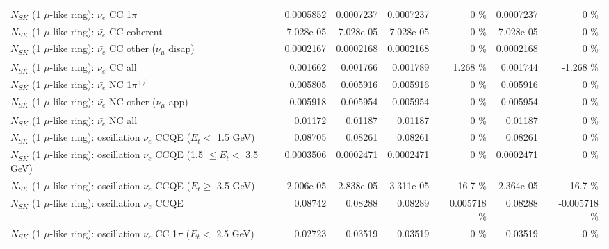\begin{table}
\begin{tabular}{| l | r | r | r  r | r  r |}
\hline
                           $N_{SK}$ (1 $\mu$-like ring): $\bar{\nu_e}$ CC 1$\pi$ &       0.0005852 &       0.0007237 &       0.0007237 &        0 \%  &       0.0007237 &        0 \%  \\ 
                         $N_{SK}$ (1 $\mu$-like ring): $\bar{\nu_e}$ CC coherent &       7.028e-05 &       7.028e-05 &       7.028e-05 &        0 \%  &       7.028e-05 &        0 \%  \\ 
          $N_{SK}$ (1 $\mu$-like ring): $\bar{\nu_e}$ CC other ($\nu_\mu$ disap) &       0.0002167 &       0.0002168 &       0.0002168 &        0 \%  &       0.0002168 &        0 \%  \\ 
                            $N_{SK}$ (1 $\mu$-like ring): $\bar{\nu_{e}}$ CC all &        0.001662 &        0.001766 &        0.001789 &    1.268 \%  &        0.001744 &   -1.268 \%  \\ 
\hline
                     $N_{SK}$ (1 $\mu$-like ring): $\bar{\nu_e}$ NC 1$\pi^{+/-}$ &        0.005805 &        0.005916 &        0.005916 &        0 \%  &        0.005916 &        0 \%  \\ 
            $N_{SK}$ (1 $\mu$-like ring): $\bar{\nu_e}$ NC other ($\nu_\mu$ app) &        0.005918 &        0.005954 &        0.005954 &        0 \%  &        0.005954 &        0 \%  \\ 
                            $N_{SK}$ (1 $\mu$-like ring): $\bar{\nu_{e}}$ NC all &         0.01172 &         0.01187 &         0.01187 &        0 \%  &         0.01187 &        0 \%  \\ 
\hline
\hline
\hline
      $N_{SK}$ (1 $\mu$-like ring): oscillation $\nu_e$ CCQE ($E_{t} <$ 1.5 GeV) &         0.08705 &         0.08261 &         0.08261 &        0 \%  &         0.08261 &        0 \%  \\ 
$N_{SK}$ (1 $\mu$-like ring): oscillation $\nu_e$ CCQE (1.5 $\leq E_{t} <$ 3.5 GeV) &       0.0003506 &       0.0002471 &       0.0002471 &        0 \%  &       0.0002471 &        0 \%  \\ 
   $N_{SK}$ (1 $\mu$-like ring): oscillation $\nu_e$ CCQE ($E_{t} \geq$ 3.5 GeV) &       2.006e-05 &       2.838e-05 &       3.311e-05 &     16.7 \%  &       2.364e-05 &    -16.7 \%  \\ 
\hline
                          $N_{SK}$ (1 $\mu$-like ring): oscillation $\nu_e$ CCQE &         0.08742 &         0.08288 &         0.08289 & 0.005718 \%  &         0.08288 & -0.005718 \%  \\ 
\hline
 $N_{SK}$ (1 $\mu$-like ring): oscillation $\nu_e$ CC 1$\pi$ ($E_{t} <$ 2.5 GeV) &         0.02723 &         0.03519 &         0.03519 &        0 \%  &         0.03519 &        0 \%  \\ 

\end{tabular}
\end{table}
